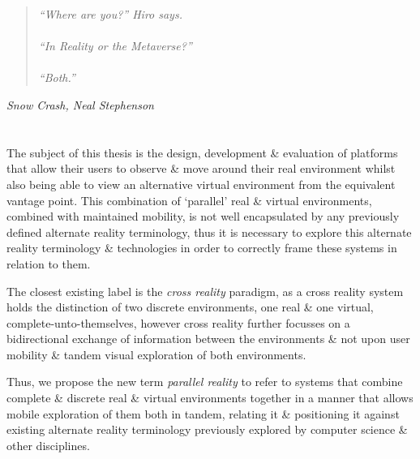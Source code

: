 \begin{quote}
\textit{``Where are you?'' Hiro says.
\\
\\
``In Reality or the Metaverse?''
\\
\\
``Both.''}
\end{quote}
\hfill \textit{Snow Crash, Neal Stephenson}
\\
\\
\\




The subject of this thesis is the design, development \& evaluation of platforms that allow their users to observe \& move around their real environment whilst also being able to view an alternative virtual environment from the equivalent vantage point. This combination of `parallel' real \& virtual environments, combined with maintained mobility, is not well encapsulated by any previously defined alternate reality terminology, thus it is necessary to explore this alternate reality terminology \& technologies in order to correctly frame these systems in relation to them.

The closest existing label is the \textit{cross reality} paradigm, as a cross reality system holds the distinction of two discrete environments, one real \& one virtual, complete-unto-themselves, however cross reality further focusses on a bidirectional exchange of information between the environments \& not upon user mobility \& tandem visual exploration of both environments.

Thus, we propose the new term \textit{parallel reality} to refer to systems that combine complete \& discrete real \& virtual environments together in a manner that allows mobile exploration of them both in tandem, relating it \& positioning it against existing alternate reality terminology previously explored by computer science \& other disciplines.


